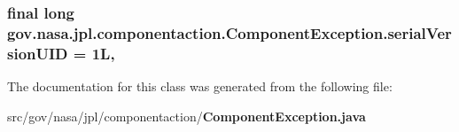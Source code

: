 \subsubsection[{serial\+Version\+U\+ID}]{\setlength{\rightskip}{0pt plus 5cm}final long gov.\+nasa.\+jpl.\+componentaction.\+Component\+Exception.\+serial\+Version\+U\+ID = 1L\hspace{0.3cm}{\ttfamily [static]}, {\ttfamily [private]}}\label{classgov_1_1nasa_1_1jpl_1_1componentaction_1_1_component_exception_ad5f6a95f567ac0ae10778104cf663b36}


The documentation for this class was generated from the following file\+:\begin{DoxyCompactItemize}
\item 
src/gov/nasa/jpl/componentaction/{\bf Component\+Exception.\+java}\end{DoxyCompactItemize}
